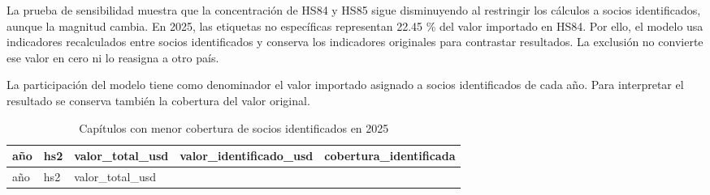 \documentclass[
]{article}
\begin{document}
La prueba de sensibilidad muestra que la concentración de HS84 y HS85
sigue disminuyendo al restringir los cálculos a socios identificados,
aunque la magnitud cambia. En 2025, las etiquetas no específicas
representan 22.45 \% del valor importado en HS84. Por ello, el modelo
usa indicadores recalculados entre socios identificados y conserva los
indicadores originales para contrastar resultados. La exclusión no
convierte ese valor en cero ni lo reasigna a otro país.

La participación del modelo tiene como denominador el valor importado
asignado a socios identificados de cada año. Para interpretar el
resultado se conserva también la cobertura del valor original.

\begin{longtable}[]{@{}
  >{\raggedleft\arraybackslash}p{}
  >{\raggedright\arraybackslash}p{}
  >{\raggedleft\arraybackslash}p{}
  >{\raggedleft\arraybackslash}p{}
  >{\raggedleft\arraybackslash}p{}@{}}
\caption{Capítulos con menor cobertura de socios identificados en
2025}\tabularnewline
\toprule\noalign{}
\begin{minipage}[b]{\linewidth}\raggedleft
año
\end{minipage} & \begin{minipage}[b]{\linewidth}\raggedright
hs2
\end{minipage} & \begin{minipage}[b]{\linewidth}\raggedleft
valor\_total\_usd
\end{minipage} & \begin{minipage}[b]{\linewidth}\raggedleft
valor\_identificado\_usd
\end{minipage} & \begin{minipage}[b]{\linewidth}\raggedleft
cobertura\_identificada
\end{minipage} \\
\midrule\noalign{}
\endfirsthead
\toprule\noalign{}
\begin{minipage}[b]{\linewidth}\raggedleft
año
\end{minipage} & \begin{minipage}[b]{\linewidth}\raggedright
hs2
\end{minipage} & \begin{minipage}[b]{\linewidth}\raggedleft
valor\_total\_usd
\end{minipage} & \begin{minipage}[b]{\linewidth}\raggedleft

\end{minipage}
\end{longtable}
\end{document}
